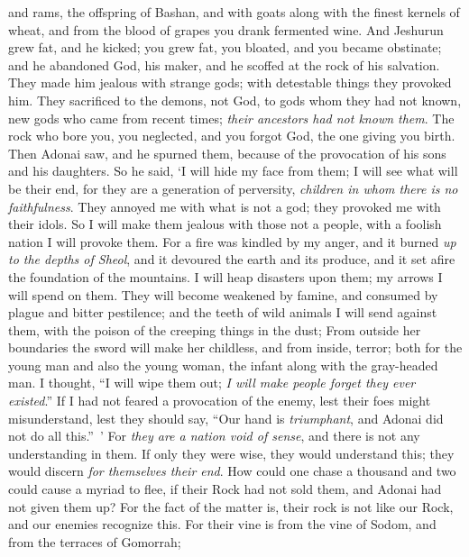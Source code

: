 \begin{biblechapter}
and rams, the offspring of Bashan, 
and with goats along with the finest kernels of wheat, 
and from the blood of grapes you drank fermented wine.
\verse And Jeshurun grew fat, and he kicked; 
you grew fat, you bloated, and you became obstinate; 
and he abandoned God, his maker, 
and he scoffed at the rock of his salvation.
\verse They made him jealous with strange gods; 
with detestable things they provoked him.
\verse They sacrificed to the demons, not God, 
to gods whom they had not known, 
new gods who came from recent times; 
\textit{their ancestors had not known them}.
\verse The rock who bore you, you neglected, 
and you forgot God, the one giving you birth.
\verse Then Adonai saw, and he spurned them, 
because of the provocation of his sons and his daughters.
\verse So he said, ‘I will hide my face from them; 
I will see what will be their end, 
for they are a generation of perversity, 
\textit{children in whom there is no faithfulness}.
\verse They annoyed me with what is not a god; 
they provoked me with their idols. 
So I will make them jealous with those not a people, 
with a foolish nation I will provoke them.
\verse For a fire was kindled by my anger, 
and it burned \textit{up to the depths of Sheol}, 
and it devoured the earth and its produce, 
and it set afire the foundation of the mountains.
\verse I will heap disasters upon them; 
my arrows I will spend on them.
\verse They will become weakened by famine, 
and consumed by plague and bitter pestilence; 
and the teeth of wild animals I will send against them, 
with the poison of the creeping things in the dust;
\verse From outside her boundaries the sword will make her childless, 
and from inside, terror; 
both for the young man and also the young woman, 
the infant along with the gray-headed man.
\verse I thought, “I will wipe them out; 
\textit{I will make people forget they ever existed}.”
\verse If I had not feared a provocation of the enemy, 
lest their foes might misunderstand,  
lest they should say,  “Our hand is 
\textit{triumphant}, and Adonai did not do all this.” ’
\verse For \textit{they are a nation void of sense}, 
and there is not any understanding in them.
\verse If only they were wise, they would understand this; 
they would discern \textit{for themselves their end}.
\verse How could one chase a thousand 
and two could cause a myriad to flee, 
if their Rock had not sold them, 
and Adonai had not given them up?
\verse For the fact of the matter is, 
their rock is not like our Rock, 
and our enemies recognize this.
\verse For their vine is from the vine of Sodom, 
and from the terraces of Gomorrah; 

\end{biblechapter}
